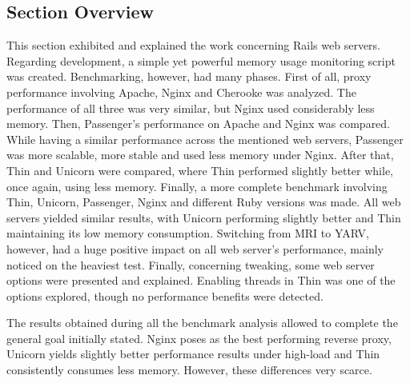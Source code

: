 \subsection{Section Overview}
This section exhibited and explained the work concerning Rails web servers. Regarding development, a simple yet powerful memory usage monitoring script was created. Benchmarking, however, had many phases. First of all, proxy performance involving Apache, Nginx and Cherooke was analyzed. The performance of all three was very similar, but Nginx used considerably less memory. Then, Passenger's performance on Apache and Nginx was compared. While having a similar performance across the mentioned web servers, Passenger was more scalable, more stable and used less memory under Nginx. After that, Thin and Unicorn were compared, where Thin performed slightly better while, once again, using less memory. Finally, a more complete benchmark involving Thin, Unicorn, Passenger, Nginx and different Ruby versions was made. All web servers yielded similar results, with Unicorn performing slightly better and Thin maintaining its low memory consumption. Switching from MRI to YARV, however, had a huge positive impact on all web server's performance, mainly noticed on the heaviest test. Finally, concerning tweaking, some web server options were presented and explained. Enabling threads in Thin was one of the options explored, though no performance benefits were detected.

The results obtained during all the benchmark analysis allowed to complete the general goal initially stated. Nginx poses as the best performing reverse proxy, Unicorn yields slightly better performance results under high-load and Thin consistently consumes less memory. However, these differences very scarce.
